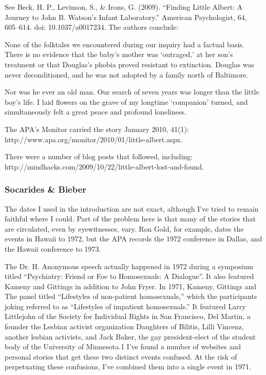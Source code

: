 See Beck, H. P., Levinson, S., \& Irons, G. (2009). ``Finding Little Albert: A Journey to John B. Watson's Infant Laboratory.'' American Psychologist, 64, 605--614. doi: 10.1037\slash a0017234. The authors conclude:

None of the folktales we encountered during our inquiry had a factual basis. There is no evidence that the baby's mother was `outraged‚' at her son's treatment or that Douglas's phobia proved resistant to extinction. Douglas was never deconditioned, and he was not adopted by a family north of Baltimore.

Nor was he ever an old man. Our search of seven years was longer than the little boy's life. I laid flowers on the grave of my longtime `companion' turned, and simultaneously felt a great peace and profound loneliness.

The APA's Monitor carried the story January 2010, 41(1): http:\slash \slash www.apa.org\slash monitor\slash 2010\slash 01\slash little-albert.aspx.

There were a number of blog posts that followed, including: http:\slash \slash mindhacks.com\slash 2009\slash 10\slash 22\slash little-albert-lost-and-found. 

\subsubsection{Socarides \& Bieber}
\label{socaridesbieber}

The dates I used in the introduction are not exact, although I've tried to remain faithful where I could. Part of the problem here is that many of the stories that are circulated, even by eyewitnesses, vary. Ron Gold, for example, dates the events in Hawaii to 1972, but the APA records the 1972 conference in Dallas, and the Hawaii conference to 1973. 

The Dr. H. Anonymous speech actually happened in 1972 during a symposium titled ``Psychiatry: Friend or Foe to Homosexuals: A Dialogue''. It also featured Kameny and Gittings in addition to John Fryer. In 1971, Kameny, Gittings and The panel titled ``Lifestyles of non-patient homosexuals,'' which the participants joking referred to as ``Lifestyles of impatient homosexuals.'' It featured Larry Littlejohn of the Society for Individual Rights in San Francisco, Del Martin, a founder the Lesbian activist organization Daughters of Bilitis, Lilli Vincenz, another lesbian activists, and Jack Baker, the gay president-elect of the student body of the University of Minnesota.1 I've found a number of websites and personal stories that get these two distinct events confused. At the risk of perpetuating these confusions, I've combined them into a single event in 1971.

